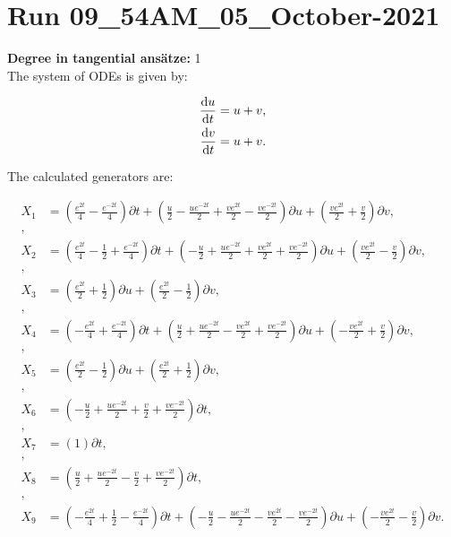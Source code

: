 \section*{Run 09\_54AM\_05\_October-2021}
\textbf{Degree in tangential ansätze:}	1\\
The system of ODEs is given by:

\begin{align*}
\dv{u}{t}&=u + v,\\
\dv{v}{t}&=u + v.\\
\end{align*}

\noindent The calculated generators are:

\begin{align*}
X_{1}&=\left( \frac{e^{2 t}}{4} - \frac{e^{- 2 t}}{4} \right)\partial t+\left( \frac{u}{2} - \frac{u e^{- 2 t}}{2} + \frac{v e^{2 t}}{2} - \frac{v e^{- 2 t}}{2} \right)\partial u+\left( \frac{v e^{2 t}}{2} + \frac{v}{2} \right)\partial v,\\
,\\
X_{2}&=\left( \frac{e^{2 t}}{4} - \frac{1}{2} + \frac{e^{- 2 t}}{4} \right)\partial t+\left( - \frac{u}{2} + \frac{u e^{- 2 t}}{2} + \frac{v e^{2 t}}{2} + \frac{v e^{- 2 t}}{2} \right)\partial u+\left( \frac{v e^{2 t}}{2} - \frac{v}{2} \right)\partial v,\\
,\\
X_{3}&=\left( \frac{e^{2 t}}{2} + \frac{1}{2} \right)\partial u+\left( \frac{e^{2 t}}{2} - \frac{1}{2} \right)\partial v,\\
,\\
X_{4}&=\left( - \frac{e^{2 t}}{4} + \frac{e^{- 2 t}}{4} \right)\partial t+\left( \frac{u}{2} + \frac{u e^{- 2 t}}{2} - \frac{v e^{2 t}}{2} + \frac{v e^{- 2 t}}{2} \right)\partial u+\left( - \frac{v e^{2 t}}{2} + \frac{v}{2} \right)\partial v,\\
,\\
X_{5}&=\left( \frac{e^{2 t}}{2} - \frac{1}{2} \right)\partial u+\left( \frac{e^{2 t}}{2} + \frac{1}{2} \right)\partial v,\\
,\\
X_{6}&=\left( - \frac{u}{2} + \frac{u e^{- 2 t}}{2} + \frac{v}{2} + \frac{v e^{- 2 t}}{2} \right)\partial t,\\
,\\
X_{7}&=\left( 1 \right)\partial t,\\
,\\
X_{8}&=\left( \frac{u}{2} + \frac{u e^{- 2 t}}{2} - \frac{v}{2} + \frac{v e^{- 2 t}}{2} \right)\partial t,\\
,\\
X_{9}&=\left( - \frac{e^{2 t}}{4} + \frac{1}{2} - \frac{e^{- 2 t}}{4} \right)\partial t+\left( - \frac{u}{2} - \frac{u e^{- 2 t}}{2} - \frac{v e^{2 t}}{2} - \frac{v e^{- 2 t}}{2} \right)\partial u+\left( - \frac{v e^{2 t}}{2} - \frac{v}{2} \right)\partial v.\\
\end{align*}
